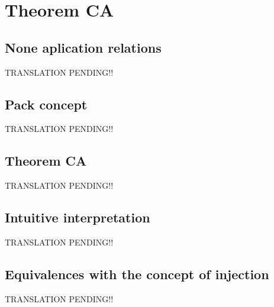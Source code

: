 \chapter{Theorem CA}

\newpage
\section{None aplication relations}
TRANSLATION PENDING!!

\newpage
\section{Pack concept}
TRANSLATION PENDING!!

\newpage
\section{Theorem CA}
TRANSLATION PENDING!!

\newpage
\section{Intuitive interpretation}
TRANSLATION PENDING!!

\newpage
\section{Equivalences with the concept of injection}
TRANSLATION PENDING!!